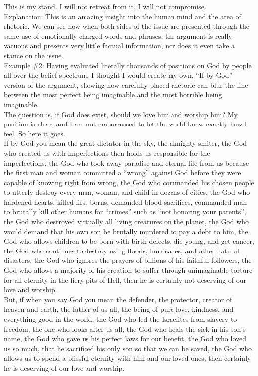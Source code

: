 \documentclass[a4paper,12pt,single,pdftex]{scrartcl}
\begin{document}
    
      This is my stand. I will not retreat from it. I will not compromise.
    \\

    
      Explanation: This is an amazing insight into the human mind and the area of rhetoric.  We can see how when both sides of the issue are presented through the same use of emotionally charged words and phrases, the argument is really vacuous and presents very little factual information, nor does it even take a stance on the issue.
    \\

    
      Example \#2: Having evaluated literally thousands of positions on God by people all over the belief spectrum, I thought I would create my own, “If-by-God” version of the argument, showing how carefully placed rhetoric can blur the line between the most perfect being imaginable and the most horrible being imaginable.
    \\

    
      The question is, if God does exist, should we love him and worship him?  My position is clear, and I am not embarrassed to let the world know exactly how I feel.  So here it goes.
    \\

    
      If by God you mean the great dictator in the sky, the almighty smiter, the God who created us with imperfections then holds us responsible for the imperfections, the God who took away paradise and eternal life from us because the first man and woman committed a “wrong” against God before they were capable of knowing right from wrong, the God who commanded his chosen people to utterly destroy every man, woman, and child in dozens of cities, the God who hardened hearts, killed first-borns, demanded blood sacrifices, commanded man to brutally kill other humans for “crimes” such as “not honoring your parents”, the God who destroyed virtually all living creatures on the planet, the God who would demand that his own son be brutally murdered to pay a debt to him, the God who allows children to be born with birth defects, die young, and get cancer, the God who continues to destroy using floods, hurricanes, and other natural disasters, the God who ignores the prayers of billions of his faithful followers, the God who allows a majority of his creation to suffer through unimaginable torture for all eternity in the fiery pits of Hell, then he is certainly not deserving of our love and worship.
    \\

    
      But, if when you say God you mean the defender, the protector, creator of heaven and earth, the father of us all, the being of pure love, kindness, and everything good in the world, the God who led the Israelites from slavery to freedom, the one who looks after us all, the God who heals the sick in his son’s name, the God who gave us his perfect laws for our benefit, the God who loved us so much, that he sacrificed his only son so that we can be saved, the God who allows us to spend a blissful eternity with him and our loved ones, then certainly he is deserving of our love and worship.
    \\
\end{document}
